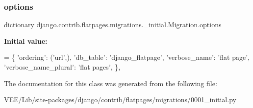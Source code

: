 \subsubsection{\texorpdfstring{options}{options}}
{\footnotesize\ttfamily dictionary django.\+contrib.\+flatpages.\+migrations.\+\_\+initial.\+Migration.\+options\hspace{0.3cm}{\ttfamily [static]}}

{\bfseries Initial value\+:}
\begin{DoxyCode}
= \{
                \textcolor{stringliteral}{'ordering'}: (\textcolor{stringliteral}{'url'},),
                \textcolor{stringliteral}{'db\_table'}: \textcolor{stringliteral}{'django\_flatpage'},
                \textcolor{stringliteral}{'verbose\_name'}: \textcolor{stringliteral}{'flat page'},
                \textcolor{stringliteral}{'verbose\_name\_plural'}: \textcolor{stringliteral}{'flat pages'},
            \},
\end{DoxyCode}


The documentation for this class was generated from the following file\+:\begin{DoxyCompactItemize}
\item 
V\+E\+E/\+Lib/site-\/packages/django/contrib/flatpages/migrations/0001\+\_\+initial.\+py\end{DoxyCompactItemize}
